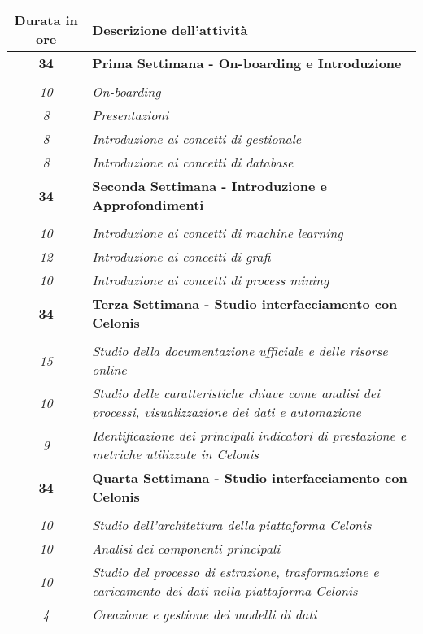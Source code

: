 


\begin{tabularx}{\textwidth}{|c|X|}
	\hline
	\textbf{Durata in ore} & \textbf{Descrizione dell'attività} \\\hline

	\textbf{34} & \textbf{Prima Settimana - On-boarding e Introduzione} \\
\hdashline
\multirow{5}{0cm}\\
\textit{10} &
\textit{On-boarding} \\
\textit{8} &
\textit{Presentazioni} \\
\textit{8} &
\textit{Introduzione ai concetti di gestionale} \\
\textit{8} &
\textit{Introduzione ai concetti di database} \\
\hline

\textbf{34} & \textbf{Seconda Settimana - Introduzione e Approfondimenti} \\
\hdashline
\multirow{4}{0cm}\\
\textit{10} &
\textit{Introduzione ai concetti di machine learning} \\
\textit{12} &
\textit{Introduzione ai concetti di grafi} \\
\textit{10} &
\textit{Introduzione ai concetti di process mining} \\
\hline

\textbf{34} & \textbf{Terza Settimana - Studio interfacciamento con Celonis} \\
\hdashline
\multirow{5}{0cm}\\
\textit{15} &
\textit{Studio della documentazione ufficiale e delle risorse online} \\
\textit{10} &
\textit{Studio delle caratteristiche chiave come analisi dei processi, visualizzazione dei dati e automazione} \\
\textit{9} &
\textit{Identificazione dei principali indicatori di prestazione e metriche utilizzate in Celonis} \\
\hline

\textbf{34} & \textbf{Quarta Settimana - Studio interfacciamento con Celonis} \\
\hdashline
\multirow{4}{0cm}\\
\textit{10} &
\textit{Studio dell'architettura della piattaforma Celonis} \\
\textit{10} &
\textit{Analisi dei componenti principali} \\
\textit{10} &
\textit{Studio del processo di estrazione, trasformazione e caricamento dei dati nella piattaforma Celonis} \\
\textit{4} &
\textit{Creazione e gestione dei modelli di dati} \\
\hline


\end{tabularx}
